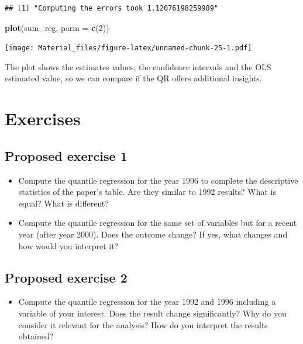 \documentclass[]{book}
\newenvironment{Shaded}{\begin{snugshade}}{\end{snugshade}}
\newcommand{\KeywordTok}[1]{\textcolor[rgb]{0.13,0.29,0.53}{\textbf{#1}}}
\newcommand{\DataTypeTok}[1]{\textcolor[rgb]{0.13,0.29,0.53}{#1}}
\newcommand{\DecValTok}[1]{\textcolor[rgb]{0.00,0.00,0.81}{#1}}
\newcommand{\NormalTok}[1]{#1}
\providecommand{\tightlist}{%
  \setlength{\itemsep}{0pt}\setlength{\parskip}{0pt}}
\begin{document}
\begin{verbatim}
## [1] "Computing the errors took 1.12076198259989"
\end{verbatim}

\begin{Shaded}
\begin{Highlighting}[]
\KeywordTok{plot}\NormalTok{(sum_reg, }\DataTypeTok{parm =} \KeywordTok{c}\NormalTok{(}\DecValTok{2}\NormalTok{))}
\end{Highlighting}
\end{Shaded}

\texttt{[image: Material\_files/figure-latex/unnamed-chunk-25-1.pdf]}

The plot shows the estimates values, the confidence intervals and the
OLS estimated value, so we can compare if the QR offers additional
insights.

\section{Exercises}\label{exercises}

\subsection{Proposed exercise 1}\label{proposed-exercise-1}

\begin{itemize}
\tightlist
\item
  Compute the quantile regression for the year 1996 to complete the
  descriptive statistics of the paper's table. Are they similar to 1992
  results? What is equal? What is different?
\item
  Compute the quantile regression for the same set of variables but for
  a recent year (after year 2000). Does the outcome change? If yes, what
  changes and how would you interpret it?
\end{itemize}

\subsection{Proposed exercise 2}\label{proposed-exercise-2}

\begin{itemize}
\tightlist
\item
  Compute the quantile regression for the year 1992 and 1996 including a
  variable of your interest. Does the result change significantly? Why
  do you consider it relevant for the analysis? How do you interpret the
  results obtained?
\end{itemize}
\end{document}
